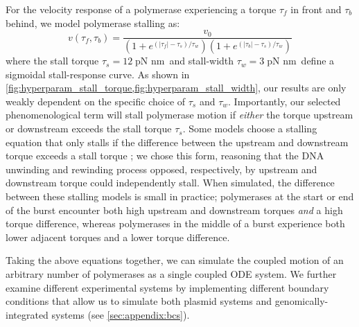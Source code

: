 \documentclass[11pt]{article}
\newcommand{\unit}[1]{\; \text{#1}\,}
\begin{document}
For the velocity response of a polymerase experiencing a torque \(\tau_f\) in front and \(\tau_b\) behind, we model polymerase stalling as:
\begin{equation}
    v(\tau_f, \tau_b) = \frac{v_0}{(1 + e^{(|\tau_f| - \tau_s)/\tau_w})(1 + e^{(|\tau_b| - \tau_s)/\tau_w})}
\label{eq:velocity_response}
\end{equation}
where the stall torque \(\tau_s = 12 \unit{pN nm}\) and stall-width \(\tau_w = 3 \unit{pN nm}\) define a sigmoidal stall-response curve.
As shown in \cref{fig:hyperparam_stall_torque,fig:hyperparam_stall_width}, our results are only weakly dependent on the specific choice of \(\tau_s\) and \(\tau_w\).
Importantly, our selected phenomenological term will stall polymerase motion if \emph{either} the torque upstream or downstream exceeds the stall torque \(\tau_s\). Some models choose a stalling equation that only stalls if the difference between the upstream and downstream torque exceeds a stall torque \parencite{tripathiDNASupercoilingmediatedCollective2021}; we chose this form, reasoning that the DNA unwinding and rewinding process opposed, respectively, by upstream and downstream torque could independently stall. When simulated, the difference between these stalling models is small in practice; polymerases at the start or end of the burst encounter both high upstream and downstream torques \emph{and} a high torque difference, whereas polymerases in the middle of a burst experience both lower adjacent torques and a lower torque difference.

Taking the above equations together, we can simulate the coupled motion of an arbitrary number of polymerases as a single coupled ODE system. We further examine different experimental systems by implementing different boundary conditions that allow us to simulate both plasmid systems and genomically-integrated systems (see \cref{sec:appendix:bcs}).

\end{document}
